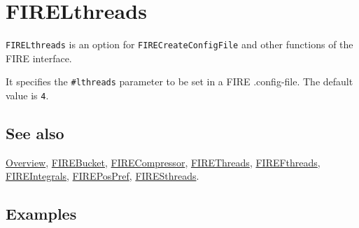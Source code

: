 \documentclass[../FeynHelpersManual.tex]{subfiles}
\begin{document}
\hypertarget{firelthreads}{
\section{FIRELthreads}\label{firelthreads}}

\texttt{FIRELthreads} is an option for \texttt{FIRECreateConfigFile} and
other functions of the FIRE interface.

It specifies the \texttt{\#{}\allowbreak{}lthreads} parameter to be set
in a FIRE .config-file. The default value is \texttt{4}.

\subsection{See also}

\hyperlink{toc}{Overview}, \hyperlink{firebucket}{FIREBucket},
\hyperlink{firecompressor}{FIRECompressor},
\hyperlink{firethreads}{FIREThreads},
\hyperlink{firefthreads}{FIREFthreads},
\hyperlink{fireintegrals}{FIREIntegrals},
\hyperlink{firepospref}{FIREPosPref},
\hyperlink{firesthreads}{FIRESthreads}.

\subsection{Examples}
\end{document}
